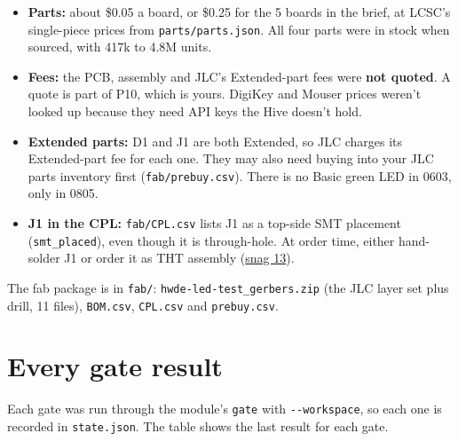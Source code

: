 \documentclass[
  10pt,
]{article}
\providecommand{\tightlist}{%
  \setlength{\itemsep}{0pt}\setlength{\parskip}{0pt}}
\begin{document}
\begin{itemize}
\tightlist
\item
  \textbf{Parts:} about \$0.05 a board, or \$0.25 for the 5 boards in
  the brief, at LCSC's single-piece prices from
  \texttt{parts/parts.json}. All four parts were in stock when sourced,
  with 417k to 4.8M units.
\item
  \textbf{Fees:} the PCB, assembly and JLC's Extended-part fees were
  \textbf{not quoted}. A quote is part of P10, which is yours. DigiKey
  and Mouser prices weren't looked up because they need API keys the
  Hive doesn't hold.
\item
  \textbf{Extended parts:} D1 and J1 are both Extended, so JLC charges
  its Extended-part fee for each one. They may also need buying into
  your JLC parts inventory first (\texttt{fab/prebuy.csv}). There is no
  Basic green LED in 0603, only in 0805.
\item
  \textbf{J1 in the CPL:} \texttt{fab/CPL.csv} lists J1 as a top-side
  SMT placement (\texttt{smt\_placed}), even though it is through-hole.
  At order time, either hand-solder J1 or order it as THT assembly
  (\hyperref[snags-the-run-hit]{snag 13}).
\end{itemize}

The fab package is in \texttt{fab/}: \texttt{hwde-led-test\_gerbers.zip}
(the JLC layer set plus drill, 11 files), \texttt{BOM.csv},
\texttt{CPL.csv} and \texttt{prebuy.csv}.

\section{Every gate result}\label{every-gate-result}

Each gate was run through the module's \texttt{gate} with
\texttt{-\/-workspace}, so each one is recorded in \texttt{state.json}.
The table shows the last result for each gate.
\end{document}

